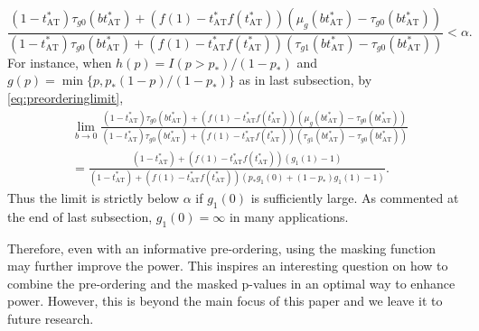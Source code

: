 \documentclass{biometrika}
\newcommand{\pth}{p_{*}}
\newcommand{\1}{\mathbf{1}}
\begin{document}
\[\frac{(1 - t_{\mathrm{AT}}^{*})\tau_{g0}(bt_{\mathrm{AT}}^{*}) + (f(1) - t_{\mathrm{AT}}^{*}f(t_{\mathrm{AT}}^{*}))(\mu_{g}(bt_{\mathrm{AT}}^{*}) - \tau_{g0}(bt_{\mathrm{AT}}^{*}))}{(1 - t_{\mathrm{AT}}^{*})\tau_{g0}(bt_{\mathrm{AT}}^{*}) + (f(1) - t_{\mathrm{AT}}^{*}f(t_{\mathrm{AT}}^{*}))(\tau_{g1}(bt_{\mathrm{AT}}^{*}) - \tau_{g0}(bt_{\mathrm{AT}}^{*}))} < \alpha.\]
For instance, when $h(p) = I(p > \pth) / (1 - \pth)$ and $g(p) = \min\{p, \pth (1 - p) / (1 - \pth)\}$ as in last subsection, by \eqref{eq:preorderinglimit},
\begin{align*}
  &\lim_{b\rightarrow 0}\frac{(1 - t_{\mathrm{AT}}^{*})\tau_{g0}(bt_{\mathrm{AT}}^{*}) + (f(1) - t_{\mathrm{AT}}^{*}f(t_{\mathrm{AT}}^{*}))(\mu_{g}(bt_{\mathrm{AT}}^{*}) - \tau_{g0}(bt_{\mathrm{AT}}^{*}))}{(1 - t_{\mathrm{AT}}^{*})\tau_{g0}(bt_{\mathrm{AT}}^{*}) + (f(1) - t_{\mathrm{AT}}^{*}f(t_{\mathrm{AT}}^{*}))(\tau_{g1}(bt_{\mathrm{AT}}^{*}) - \tau_{g0}(bt_{\mathrm{AT}}^{*}))} \\
& =  \frac{(1 - t_{\mathrm{AT}}^{*}) + (f(1) - t_{\mathrm{AT}}^{*}f(t_{\mathrm{AT}}^{*}))(g_{1}(1) - 1)}{(1 - t_{\mathrm{AT}}^{*}) + (f(1) - t_{\mathrm{AT}}^{*}f(t_{\mathrm{AT}}^{*}))(\pth g_{1}(0) + (1 - \pth)g_{1}(1) - 1)}.
\end{align*}
Thus the limit is strictly below $\alpha$ if $g_{1}(0)$ is sufficiently large. As commented at the end of last subsection, $g_{1}(0) = \infty$ in many applications. 

Therefore, even with an informative pre-ordering, using the masking function may further improve the power. This inspires an interesting question on how to combine the pre-ordering and the masked p-values in an optimal way to enhance power. However, this is beyond the main focus of this paper and we leave it to future research.
\end{document}
